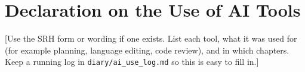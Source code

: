 \chapter*{Declaration on the Use of AI Tools}
[Use the SRH form or wording if one exists. List each tool, what it was used for (for example planning, language editing, code review), and in which chapters. Keep a running log in \texttt{diary/ai\_use\_log.md} so this is easy to fill in.]
